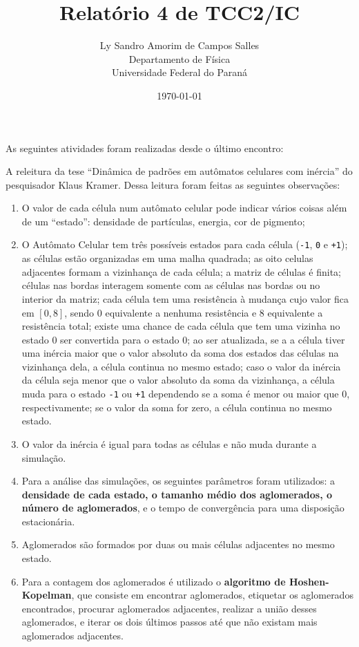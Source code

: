 \documentclass[12pt,a4paper,final]{article}
\title{Relatório 4 de TCC2/IC}
\author{Ly Sandro Amorim de Campos Salles\\Departamento de Física\\Universidade Federal do Paraná}
\date{\today}
\begin{document}
	\maketitle

  As seguintes atividades foram realizadas desde o último encontro:

  A releitura da tese ``Dinâmica de padrões em autômatos celulares com inércia'' do pesquisador Klaus Kramer. Dessa leitura foram feitas as seguintes observações:
  \begin{enumerate}
    \item O valor de cada célula num autômato celular pode indicar vários coisas além de um ``estado'': densidade de partículas, energia, cor de pigmento;
    \item O Autômato Celular tem três possíveis estados para cada célula (\texttt{-1}, \texttt{0} e \texttt{+1}); as células estão organizadas em uma malha quadrada; as oito celulas adjacentes formam a vizinhança de cada célula; a matriz de células é finita; células nas bordas interagem somente com as células nas bordas ou no interior da matriz; cada célula tem uma resistência à mudança cujo valor fica em $[0, 8]$, sendo $0$ equivalente a nenhuma resistência e $8$ equivalente a resistência total; existe uma chance de cada célula que tem uma vizinha no estado $0$ ser convertida para o estado $0$; ao ser atualizada, se a a célula tiver uma inércia maior que o valor absoluto da soma dos estados das células na vizinhança dela, a célula continua no mesmo estado; caso o valor da inércia da célula seja menor que o valor absoluto da soma da vizinhança, a célula muda para o estado \texttt{-1} ou \texttt{+1} dependendo se a soma é menor ou maior que $0$, respectivamente; se o valor da soma for zero, a célula continua no mesmo estado.
    \item O valor da inércia é igual para todas as células e não muda durante a simulação.
    \item Para a análise das simulações, os seguintes parâmetros foram utilizados: a \textbf{densidade de cada estado, o tamanho médio dos aglomerados, o número de aglomerados}, e o tempo de convergência para uma disposição estacionária.
    \item Aglomerados são formados por duas ou mais células adjacentes no mesmo estado.
    \item Para a contagem dos aglomerados é utilizado o \textbf{algoritmo de Hoshen-Kopelman}, que consiste em encontrar aglomerados, etiquetar os aglomerados encontrados, procurar aglomerados adjacentes, realizar a união desses aglomerados, e iterar os dois últimos passos até que não existam mais aglomerados adjacentes.

\end{enumerate}
\end{document}

